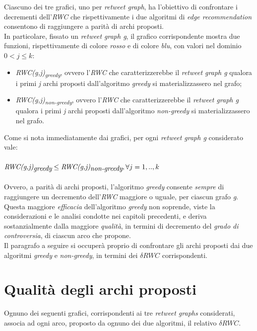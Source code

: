 


Ciascuno dei tre grafici, uno per \textit{retweet graph}, ha l'obiettivo di confrontare i decrementi dell'\textit{RWC} che rispettivamente i due algoritmi di \textit{edge recommendation} consentono di raggiungere a parità di archi proposti. 
\\In particolare, fissato un \textit{retweet graph g}, il grafico corrispondente mostra due funzioni, rispettivamente di colore \textit{rosso} e di colore \textit{blu}, con valori nel dominio \textit{$0 < j \leq k$}:
\begin{itemize}
\item \textit{RWC(g,j)\textsubscript{greedy}}, ovvero l'\textit{RWC} che caratterizzerebbe il \textit{retweet graph g} qualora i primi \textit{j} archi proposti dall'algoritmo \textit{greedy} si materializzassero nel grafo; 
\item \textit{RWC(g,j)\textsubscript{non-greedy}}, ovvero l'\textit{RWC} che caratterizzerebbe il \textit{retweet graph g} qualora i primi \textit{j} archi proposti dall'algoritmo \textit{non-greedy} si materializzassero nel grafo.
\end{itemize}
Come si nota immediatamente dai grafici, per ogni \textit{retweet graph g} considerato vale:
\\\\
$\textit{RWC(g,j)\textsubscript{greedy}} \leq \textit{RWC(g,j)\textsubscript{non-greedy}}, \forall j = 1,..,k$
\\\\
Ovvero, a parità di archi proposti, l'algoritmo \textit{greedy} consente \textit{sempre} di raggiungere un decremento dell'\textit{RWC} maggiore o uguale, per ciascun grafo \textit{g}. Questa maggiore \textit{efficacia} dell'algoritmo \textit{greedy} non soprende, viste la considerazioni e le analisi condotte nei capitoli precedenti, e deriva sostanzialmente dalla maggiore \textit{qualità}, in termini di decremento del \textit{grado di controversia}, di ciascun arco che propone. 
\\Il paragrafo a seguire si occuperà proprio di confrontare gli archi proposti dai due algoritmi \textit{greedy} e \textit{non-greedy}, in termini dei \textit{$\delta RWC$} corrispondenti.

\section{Qualità degli archi proposti}
Ognuno dei seguenti grafici, corrispondenti ai tre \textit{retweet graphs} considerati, associa ad ogni arco, proposto da ognuno dei due algoritmi, il relativo \textit{$\delta RWC$}.

